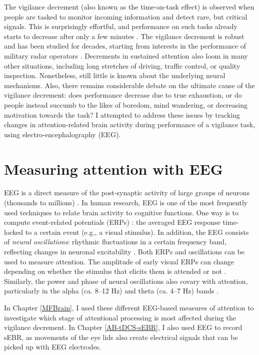 \documentclass[11pt,english,]{memoir}
\begin{document}
The vigilance decrement (also known as the time-on-task effect) is observed when people are tasked to monitor incoming information and detect rare, but critical signals. This is surprisingly effortful, and performance on such tasks already starts to decrease after only a few minutes \autocite{Warm2008}. The vigilance decrement is robust and has been studied for decades, starting from interests in the performance of military radar operators \autocite{Mackworth1948}. Decrements in sustained attention also loom in many other situations, including long stretches of driving, traffic control, or quality inspection. Nonetheless, still little is known about the underlying neural mechanisms. Also, there remains considerable debate on the ultimate cause of the vigilance decrement: does performance decrease due to true exhaustion, or do people instead succumb to the likes of boredom, mind wandering, or decreasing motivation towards the task? I attempted to address these issues by tracking changes in attention-related brain activity during performance of a vigilance task, using electro-encephalography (EEG).

\hypertarget{measuring-attention-with-eeg}{%
\section{Measuring attention with EEG}\label{measuring-attention-with-eeg}}

EEG is a direct measure of the post-synaptic activity of large groups of neurons (thousands to millions) \autocite{Cohen2017}. In human research, EEG is one of the most frequently used techniques to relate brain activity to cognitive functions. One way is to compute event-related potentials (ERPs) \autocite{Luck2005}: the averaged EEG response time-locked to a certain event (e.g., a visual stimulus). In addition, the EEG consists of \emph{neural oscillations}: rhythmic fluctuations in a certain frequency band, reflecting changes in neuronal excitability \autocites{Buzsaki2004d}{Cohen2014}. Both ERPs and oscillations can be used to measure attention. The amplitude of early visual ERPs can change depending on whether the stimulus that elicits them is attended or not \autocites{Luck1994}{Mangun1991}{Slagter2016}. Similarly, the power and phase of neural oscillations also covary with attention, particularly in the alpha (ca. 8--12 Hz) and theta (ca. 4--7 Hz) bands \autocites{Clayton2015}{Klimesch2012}{VanDiepen2019}.

In Chapter \ref{MFBrain}, I used these different EEG-based measures of attention to investigate which stage of attentional processing is most affected during the vigilance decrement. In Chapter \ref{AB-tDCS-sEBR}, I also used EEG to record sEBR, as movements of the eye lids also create electrical signals that can be picked up with EEG electrodes.
\end{document}
